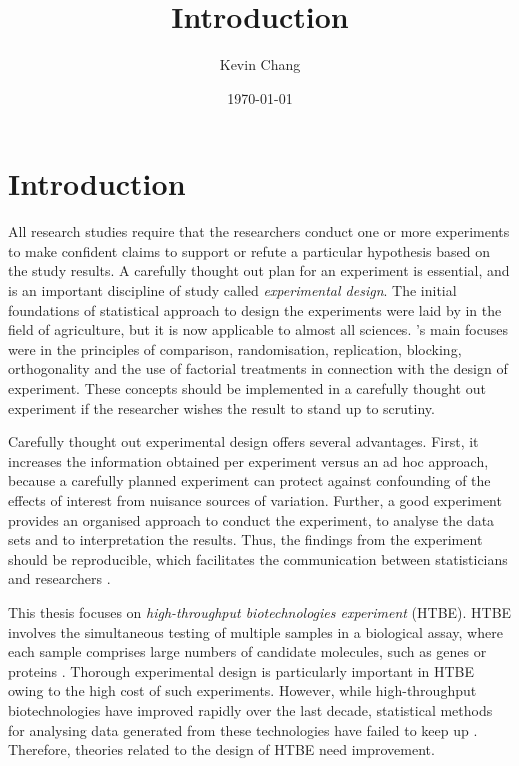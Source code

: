\documentclass[11pt,a4paper]{article}
\begin{document}
\title{Introduction}
\author{Kevin Chang}
\date{\today}
\maketitle


\section{Introduction}
All research studies require that the researchers conduct one or more experiments to make confident claims to support or refute a particular hypothesis based on the study results. A carefully thought out plan for an experiment is essential, and is an important discipline of study called \emph{experimental design}. The initial foundations of statistical approach to design the experiments were laid by \cite{Fisher1935} in the field of agriculture, but it is now applicable to almost all sciences. \citeauthor{Fisher1935}'s main focuses were in the principles of comparison, randomisation, replication, blocking, orthogonality and the use of factorial treatments in connection with the design of experiment. These concepts should be implemented in a carefully thought out experiment if the researcher wishes the result to stand up to scrutiny.


Carefully thought out experimental design offers several advantages. First, it increases the information obtained per experiment versus an ad hoc approach, because a carefully planned experiment can protect against confounding of the effects of interest from nuisance sources of variation. Further, a good experiment provides an organised approach to conduct the experiment, to analyse the data sets and to interpretation the results. Thus, the findings from the experiment should be reproducible, which facilitates the communication between statisticians and researchers  \citep{Doyle2009}. 

 
 
This thesis focuses on \emph{high-throughput biotechnologies experiment} (HTBE). HTBE involves the simultaneous testing of multiple samples in a biological assay, where each sample comprises large numbers of candidate molecules, such as genes or proteins \citep{Janzen2002}. Thorough experimental design is particularly important in HTBE owing to the high cost of such experiments. However, while high-throughput biotechnologies have improved rapidly over the last decade, statistical methods for analysing data generated from these technologies have failed to keep up \citep{Doyle2009}. Therefore, theories related to the design of HTBE need improvement. 
\end{document}
